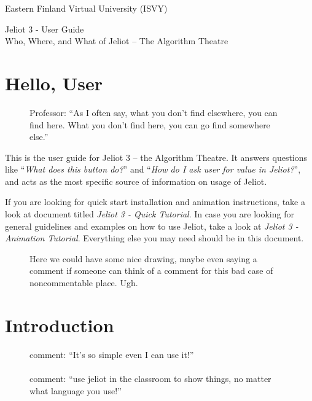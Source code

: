 \documentclass[a4paper,11pt,english]{article}
\newcommand{\jel}{Jeliot}
\begin{document}
\begin{titlepage}
\begin{flushleft}
Eastern Finland Virtual University (ISVY)
\end{flushleft}
\vfill{}
\Huge{Jeliot 3 - User Guide}\\
\Large{Who, Where, and What of \jel{} -- The Algorithm Theatre}
\vfill{}
\end{titlepage}
\pagebreak
\tableofcontents
\pagebreak


\section*{Hello, User}

\begin{figure}
\vspace{-13pt}
Professor: ``As I often say, what you don't find elsewhere, you can find here. What you don't find here, you can go find somewhere else.''
\end{figure}

This is the user guide for \jel{} 3 -- the Algorithm Theatre. It answers questions like ``\textit{What does this button do?}'' and ``\textit{How do I ask user for value in \jel{}?}'', and acts as the most specific source of information on usage of \jel{}. 

If you are looking for quick start installation and animation instructions, take a look at document titled \emph{Jeliot 3 - Quick Tutorial}. In case you are looking for general guidelines and examples on how to use \jel{}, take a look at \emph{Jeliot 3 - Animation Tutorial}. Everything else you may need should be in this document.

\begin{figure}
\vspace{-13pt}
Here we could have some nice drawing, maybe even saying a comment if someone can think of a comment for this bad case of noncommentable place. Ugh.
\end{figure}
\pagebreak

\section{Introduction}

\begin{figure}
\vspace{-13pt}
comment: ``It's so simple even I can use it!'' \\ \\
comment: ``use jeliot in the classroom to show things, no matter what language you use!''
\end{figure}
\end{document}
